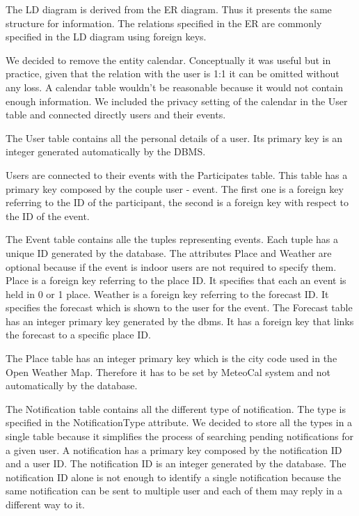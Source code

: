 \documentclass[10pt,a4paper,titlepage]{article}
\begin{document}
The LD diagram is derived from the ER diagram. Thus it presents the same structure for information. The relations specified in the ER are commonly specified in the LD diagram using foreign keys.

We decided to remove the entity calendar. Conceptually it was useful but in practice, given that the relation with the user is 1:1 it can be omitted without any loss. A calendar table wouldn’t be reasonable because it would not contain enough information. We included the privacy setting of the calendar in the User table and connected directly users and their events.

The User table contains all the personal details of a user. Its primary key is an integer generated automatically by the DBMS. 

Users are connected to their events with the Participates table. This table has a primary key composed by the couple user - event. The first one is a foreign key referring to the ID of the participant, the second is a foreign key with respect to the ID of the event.

The Event table contains alle the tuples representing events. Each tuple has a unique ID generated by the database. The attributes Place and Weather are optional because if the event is indoor users are not required to specify them. Place is a foreign key referring to the place ID. It specifies that each an event is held in 0 or 1 place. Weather is a foreign key referring to the forecast ID. It specifies the forecast which is shown to the user for the event.
The Forecast table has an integer primary key generated by the dbms. It has a foreign key that links the forecast to a specific place ID.
 
The Place table has an integer primary key which is the city code used in the Open Weather Map. Therefore it has to be set by MeteoCal system and not automatically by the database.

The Notification table contains all the different type of notification. The type is specified in the NotificationType attribute. We decided to store all the types in a single table because it simplifies the process of searching pending notifications for a given user. A notification has a primary key composed by the notification ID and a user ID. The notification ID is an integer generated by the database. The notification ID alone is not enough to identify a single notification because the same notification can be sent to multiple user and each of them may reply in a different way to it.
\end{document}
